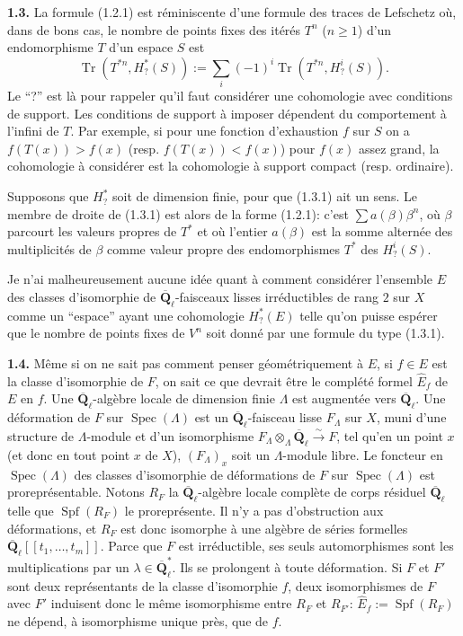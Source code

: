 \documentclass[11pt]{article}
\newcommand{\Qbl}{\overline{\mathbf{Q}}_{\ell}}
\newcommand{\Spec}{\operatorname{Spec}}
\newcommand{\Tr}{\operatorname{Tr}}
\newcommand{\para}[1]{\medskip\noindent\textbf{#1}\enspace}
\begin{document}
\para{1.3.} La formule (1.2.1) est réminiscente d'une formule des traces de Lefschetz où, dans de bons cas, le nombre de points fixes des itérés \(T^n\) (\(n\ge 1\)) d'un endomorphisme \(T\) d'un espace \(S\) est
\begin{equation}
\Tr(T^{*n},H^*_?(S)):=\sum_i(-1)^i\Tr(T^{*n},H^i_?(S)).
\tag{1.3.1}
\end{equation}
Le ``?'' est là pour rappeler qu'il faut considérer une cohomologie avec conditions de support. Les conditions de support à imposer dépendent du comportement à l'infini de \(T\). Par exemple, si pour une fonction d'exhaustion \(f\) sur \(S\) on a \(f(T(x))>f(x)\) (resp. \(f(T(x))<f(x)\)) pour \(f(x)\) assez grand, la cohomologie à considérer est la cohomologie à support compact (resp. ordinaire).

Supposons que \(H^*_?\) soit de dimension finie, pour que (1.3.1) ait un sens. Le membre de droite de (1.3.1) est alors de la forme (1.2.1): c'est \(\sum a(\beta)\beta^n\), où \(\beta\) parcourt les valeurs propres de \(T^*\) et où l'entier \(a(\beta)\) est la somme alternée des multiplicités de \(\beta\) comme valeur propre des endomorphismes \(T^*\) des \(H^i_?(S)\).

Je n'ai malheureusement aucune idée quant à comment considérer l'ensemble \(E\) des classes d'isomorphie de \(\Qbl\)-faisceaux lisses irréductibles de rang \(2\) sur \(X\) comme un ``espace'' ayant une cohomologie \(H^*_?(E)\) telle qu'on puisse espérer que le nombre de points fixes de \(V^n\) soit donné par une formule du type (1.3.1).

\para{1.4.} Même si on ne sait pas comment penser géométriquement à \(E\), si \(f\in E\) est la classe d'isomorphie de \(F\), on sait ce que devrait être le complété formel \(\widehat{E}_f\) de \(E\) en \(f\). Une \(\Qbl\)-algèbre locale de dimension finie \(\Lambda\) est augmentée vers \(\Qbl\). Une déformation de \(F\) sur \(\Spec(\Lambda)\) est un \(\Qbl\)-faisceau lisse \(F_\Lambda\) sur \(X\), muni d'une structure de \(\Lambda\)-module et d'un isomorphisme \(F_\Lambda\otimes_\Lambda\Qbl\overset{\sim}{\longrightarrow}F\), tel qu'en un point \(x\) (et donc en tout point \(x\) de \(X\)), \((F_\Lambda)_x\) soit un \(\Lambda\)-module libre. Le foncteur en \(\Spec(\Lambda)\) des classes d'isomorphie de déformations de \(F\) sur \(\Spec(\Lambda)\) est proreprésentable. Notons \(R_F\) la \(\Qbl\)-algèbre locale complète de corps résiduel \(\Qbl\) telle que \(\operatorname{Spf}(R_F)\) le proreprésente. Il n'y a pas d'obstruction aux déformations, et \(R_F\) est donc isomorphe à une algèbre de séries formelles \(\Qbl[[t_1,\ldots,t_m]]\). Parce que \(F\) est irréductible, ses seuls automorphismes sont les multiplications par un \(\lambda\in\Qbl^*\). Ils se prolongent à toute déformation. Si \(F\) et \(F'\) sont deux représentants de la classe d'isomorphie \(f\), deux isomorphismes de \(F\) avec \(F'\) induisent donc le même isomorphisme entre \(R_F\) et \(R_{F'}\): \(\widehat{E}_f:=\operatorname{Spf}(R_F)\) ne dépend, à isomorphisme unique près, que de \(f\).
\end{document}
